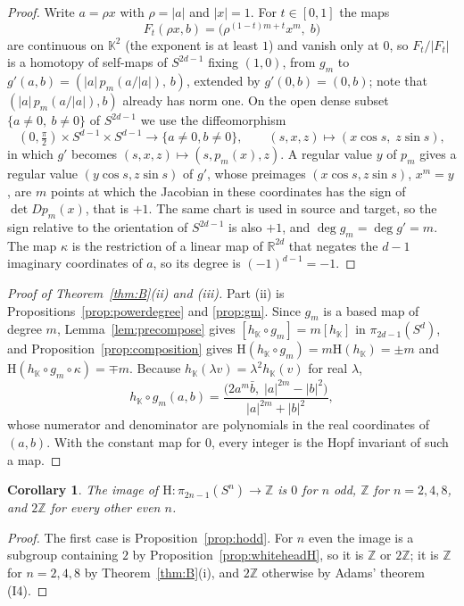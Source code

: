 \documentclass[11pt]{amsart}
\numberwithin{equation}{section}
\theoremstyle{plain}
\newtheorem{corollary}[theorem]{Corollary}
\theoremstyle{definition}
\theoremstyle{remark}
\newcommand{\R}{\mathbb{R}}
\newcommand{\K}{\mathbb{K}}
\newcommand{\Z}{\mathbb{Z}}
\newcommand{\Hopf}{\mathrm{H}}
\begin{document}
\begin{proof}
Write $a=\rho x$ with $\rho=|a|$ and $|x|=1$. For $t\in[0,1]$ the maps
\[
F_t(\rho x,b)=\bigl(\rho^{(1-t)m+t}x^m,\;b\bigr)
\]
are continuous on $\K^2$ (the exponent is at least $1$) and vanish only at $0$, so $F_t/|F_t|$ is a homotopy of self-maps of $S^{2d-1}$ fixing $(1,0)$, from $g_m$ to $g'(a,b)=(|a|\,p_m(a/|a|),\,b)$, extended by $g'(0,b)=(0,b)$; note that $(|a|\,p_m(a/|a|),b)$ already has norm one. On the open dense subset $\{a\neq0,\ b\neq0\}$ of $S^{2d-1}$ we use the diffeomorphism
\[
(0,\tfrac{\pi}{2})\times S^{d-1}\times S^{d-1}\to\{a\ne0,b\ne0\},\qquad (s,x,z)\mapsto(x\cos s,\;z\sin s),
\]
in which $g'$ becomes $(s,x,z)\mapsto(s,p_m(x),z)$. A regular value $y$ of $p_m$ gives a regular value $(y\cos s,z\sin s)$ of $g'$, whose preimages $(x\cos s,z\sin s)$, $x^m=y$, are $m$ points at which the Jacobian in these coordinates has the sign of $\det Dp_m(x)$, that is $+1$. The same chart is used in source and target, so the sign relative to the orientation of $S^{2d-1}$ is also $+1$, and $\deg g_m=\deg g'=m$. The map $\kappa$ is the restriction of a linear map of $\R^{2d}$ that negates the $d-1$ imaginary coordinates of $a$, so its degree is $(-1)^{d-1}=-1$.
\end{proof}

\begin{proof}[Proof of Theorem~\ref{thm:B}\textup{(ii)} and \textup{(iii)}]
Part (ii) is Propositions~\ref{prop:powerdegree} and \ref{prop:gm}. Since $g_m$ is a based map of degree $m$, Lemma~\ref{lem:precompose} gives $[h_\K\circ g_m]=m[h_\K]$ in $\pi_{2d-1}(S^d)$, and Proposition~\ref{prop:composition} gives $\Hopf(h_\K\circ g_m)=m\Hopf(h_\K)=\pm m$ and $\Hopf(h_\K\circ g_m\circ\kappa)=\mp m$. Because $h_\K(\lambda v)=\lambda^2h_\K(v)$ for real $\lambda$,
\begin{equation}\label{eq:hgm}
h_\K\circ g_m(a,b)=\frac{\bigl(2a^m\bar b,\;|a|^{2m}-|b|^2\bigr)}{|a|^{2m}+|b|^2},
\end{equation}
whose numerator and denominator are polynomials in the real coordinates of $(a,b)$. With the constant map for $0$, every integer is the Hopf invariant of such a map.
\end{proof}

\begin{corollary}\label{cor:image}
The image of $\Hopf\colon\pi_{2n-1}(S^n)\to\Z$ is $0$ for $n$ odd, $\Z$ for $n=2,4,8$, and $2\Z$ for every other even $n$.
\end{corollary}

\begin{proof}
The first case is Proposition~\ref{prop:hodd}. For $n$ even the image is a subgroup containing $2$ by Proposition~\ref{prop:whiteheadH}, so it is $\Z$ or $2\Z$; it is $\Z$ for $n=2,4,8$ by Theorem~\ref{thm:B}(i), and $2\Z$ otherwise by Adams' theorem (I4).
\end{proof}
\end{document}
